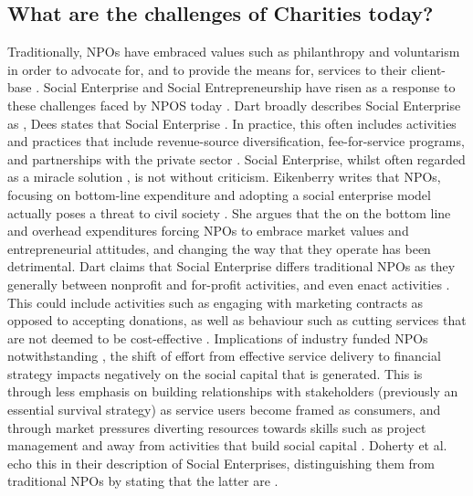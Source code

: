 \subsection{What are the challenges of Charities today?}
Traditionally, NPOs have embraced values such as philanthropy and voluntarism in order to advocate for, and to provide the means for, services to their client-base \cite{alexander_adoption_1998}.  Social Enterprise and Social Entrepreneurship have risen as a response to these challenges faced by NPOS today \cite{dart_legitimacy_2004}. Dart broadly describes Social Enterprise as  \cite{dart_legitimacy_2004}, Dees states that Social Enterprise  \cite{dees_meaning_1998}. In practice, this often includes activities and practices that include revenue-source diversification, fee-for-service programs, and partnerships with the private sector \cite{dart_legitimacy_2004}.
%
Social Enterprise, whilst often regarded as a miracle solution \cite{dart_legitimacy_2004, harding_social_2004, dees_meaning_1998}, is not without criticism. Eikenberry writes that NPOs, focusing on bottom-line expenditure and adopting a social enterprise model actually poses a threat to civil society \cite{eikenberry_marketization_2004}. She argues that the on the bottom line and overhead expenditures forcing NPOs to embrace market values and entrepreneurial attitudes, and changing the way that they operate has been detrimental. Dart claims that Social Enterprise differs traditional NPOs as they generally  between nonprofit and for-profit activities, and even enact  activities \cite{dart_legitimacy_2004}. This could include activities such as engaging with marketing contracts as opposed to accepting donations, as well as behaviour such as cutting services that are not deemed to be cost-effective \cite{eikenberry_marketization_2004}. Implications of industry funded NPOs notwithstanding \cite{jacobson_lifting_2005}, the shift of effort from effective service delivery to financial strategy impacts negatively on the social capital that is generated. This is through less emphasis on building relationships with stakeholders (previously an essential survival strategy) as service users become framed as consumers, and through market pressures diverting resources towards skills such as project management and away from activities that build social capital \cite{eikenberry_marketization_2004}. Doherty et al. echo this in their description of Social Enterprises, distinguishing them from traditional NPOs by stating that the latter are  \cite{doherty_diverse_2006}.

